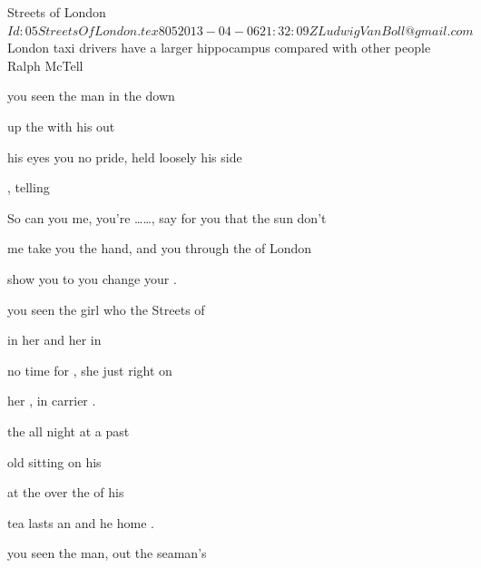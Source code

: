 \begin{SBSong}{Streets of London}
  {$Id: 05StreetsOfLondon.tex 805 2013-04-06 21:32:09Z LudwigVanBoll@gmail.com $}
  {London taxi drivers have a larger hippocampus compared with other people}
  {Ralph McTell}
  \begin{SBVerse}
	 you seen the  man in the  down 
	
	 up the  with his  out 
	
	 his eyes you  no pride,  held loosely  his side 
	
	 , telling  
  \end{SBVerse}
  \begin{SBChorus}
	So  can you  me, you're \ldots{}\ldots{}, 
	\CBLineBrk{} say for you that the sun don't 
	
	 me take you  the hand, and  you through the  of London
	
	 show you  to  you change your .
  \end{SBChorus}
  \begin{SBVerse}
	 you seen the  girl who  the Streets of 
	
	 in her  and her  in 
	
	 no time for , she just  right on 
	
	 her , in  carrier .
  \end{SBVerse}
  \begin{SBVerse}
	 the all night  at a  past 
	
	 old  sitting  on his 
	
	 at the  over the  of his 
	
	 tea lasts an  and he  home .
  \end{SBVerse}
  \begin{SBVerse}
	 you seen the  man, out  the seaman's 
	

\end{SBVerse}
\end{SBSong}
